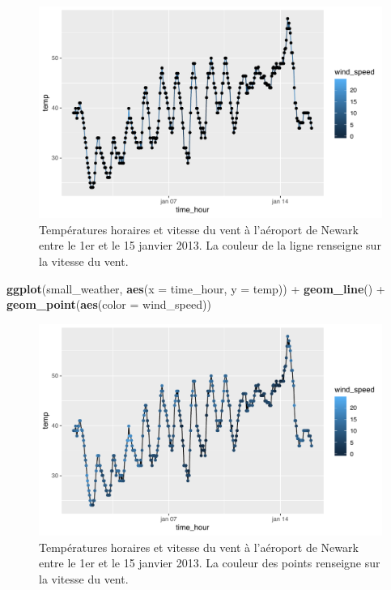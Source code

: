 \documentclass[
  a4paper,
]{article}
\newenvironment{Shaded}{\begin{snugshade}}{\end{snugshade}}
\newcommand{\DataTypeTok}[1]{\textcolor[rgb]{0.00,0.34,0.68}{#1}}
\newcommand{\KeywordTok}[1]{\textcolor[rgb]{0.12,0.11,0.11}{\textbf{#1}}}
\newcommand{\NormalTok}[1]{\textcolor[rgb]{0.12,0.11,0.11}{#1}}
\newcommand{\OperatorTok}[1]{\textcolor[rgb]{0.12,0.11,0.11}{#1}}
\newcommand{\StringTok}[1]{\textcolor[rgb]{0.75,0.01,0.01}{#1}}
\begin{document}
\begin{figure}[htpb]

{\centering \includegraphics[width=0.9\linewidth]{figure/wind2-1} 

}

\caption{Températures horaires et vitesse du vent à l'aéroport de Newark entre le 1er et le 15 janvier 2013. La couleur de la ligne renseigne sur la vitesse du vent.}\label{fig:wind2}
\end{figure}

\begin{Shaded}
\begin{Highlighting}[]
\KeywordTok{ggplot}\NormalTok{(small_weather, }\KeywordTok{aes}\NormalTok{(}\DataTypeTok{x =}\NormalTok{ time_hour, }\DataTypeTok{y =}\NormalTok{ temp)) }\OperatorTok{+}
\StringTok{  }\KeywordTok{geom_line}\NormalTok{() }\OperatorTok{+}
\StringTok{  }\KeywordTok{geom_point}\NormalTok{(}\KeywordTok{aes}\NormalTok{(}\DataTypeTok{color =}\NormalTok{ wind_speed))}
\end{Highlighting}
\end{Shaded}

\begin{figure}[htpb]

{\centering \includegraphics[width=0.9\linewidth]{figure/wind3-1} 

}

\caption{Températures horaires et vitesse du vent à l'aéroport de Newark entre le 1er et le 15 janvier 2013. La couleur des points renseigne sur la vitesse du vent.}\label{fig:wind3}
\end{figure}
\end{document}
